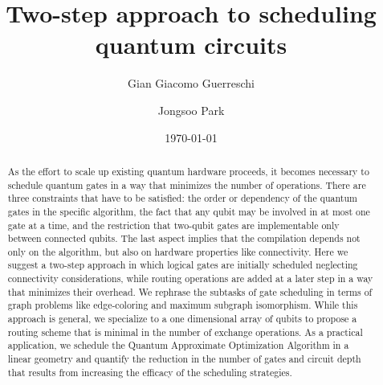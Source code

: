 \documentclass[%
onecolumn,pra,
superscriptaddress,
nofootinbib,
 amsmath,amssymb,
 aps,
11pt,
]{revtex4-1}
\begin{document}

\title{Two-step approach to scheduling quantum circuits}

\author{Gian Giacomo Guerreschi}
\author{Jongsoo Park}
\date{\today}%


\begin{abstract}
As the effort to scale up existing quantum hardware proceeds, it becomes necessary to schedule quantum gates in a way that minimizes the number of operations. There are three constraints that have to be satisfied: the order or dependency of the quantum gates in the specific algorithm, the fact that any qubit may be involved in at most one gate at a time, and the restriction that two-qubit gates are implementable only between connected qubits. The last aspect implies that the compilation depends not only on the algorithm, but also on hardware properties like connectivity. Here we suggest a two-step approach in which logical gates are initially scheduled neglecting connectivity considerations, while routing operations are added at a later step in a way that minimizes their overhead. We rephrase the subtasks of gate scheduling in terms of graph problems like edge-coloring and maximum subgraph isomorphism.
While this approach is general, we specialize to a one dimensional array of qubits to propose a routing scheme that is minimal in the number of exchange operations.
As a practical application, we schedule the Quantum Approximate Optimization Algorithm in a linear geometry and quantify the reduction in the number of gates and circuit depth that results from increasing the efficacy of the scheduling strategies.
\end{abstract}

\maketitle
\end{document}
